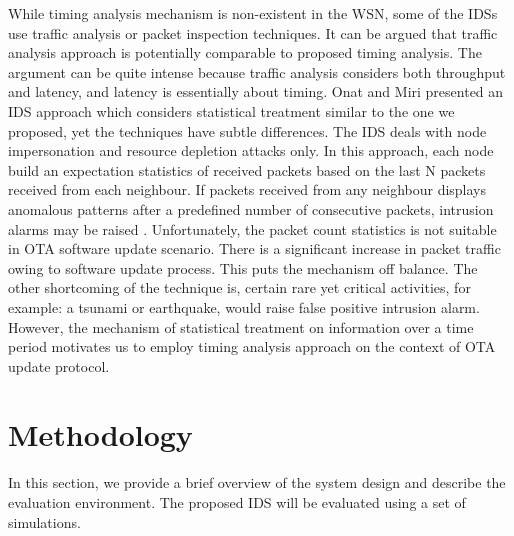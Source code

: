 \documentclass[conference]{IEEEtran}
\newcommand{\notedme}[1]{\raisebox{0pt}[0pt][0pt]{\pdfcomment[open=true,color=blue]{#1}}}
\begin{document}
While timing analysis mechanism is non-existent in the WSN, some of the IDSs use traffic analysis or packet inspection  techniques.
It can be argued that traffic analysis approach is potentially comparable to proposed timing analysis.
The argument can be quite intense because traffic analysis considers both throughput and latency, and latency is essentially about timing.
Onat and Miri presented an IDS approach which considers statistical treatment similar to the one we proposed, yet the techniques have subtle differences.
The IDS deals with node impersonation and resource depletion attacks only.
In this approach, each node build an expectation statistics of received packets based on the last N packets received from each neighbour.
If packets received from any neighbour displays anomalous patterns after a predefined number of consecutive packets, intrusion alarms may be raised \cite{1512911}.
Unfortunately, the  packet count statistics is not suitable in OTA software update scenario.
There is a significant increase in packet traffic owing to software update process. 
This puts the mechanism off balance.
The other shortcoming of the technique is, certain rare yet critical activities, for example: a tsunami or earthquake, would raise false positive intrusion alarm.
However, the mechanism of statistical treatment on information over a time period motivates us to employ timing analysis approach on the context of OTA update protocol.

\section{Methodology}
\label{sec:meth}
In this section, we provide a brief overview of the system design and describe the evaluation environment. %
The proposed IDS will be evaluated using a set of simulations. %
\end{document}
